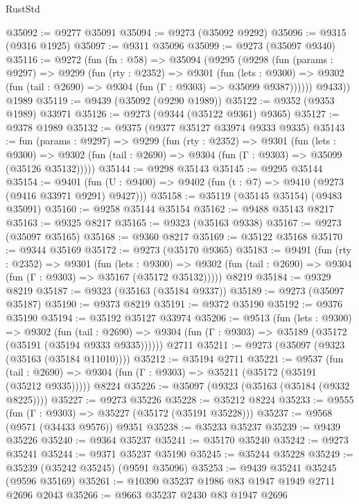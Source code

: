 \begin{lexlean}{RustStd}
\begin{coremodule}
@35092 := @9277 @35091
@35094 := @9273 (@35092 @9292)
@35096 := @9315 (@9316 @1925)
@35097 := @9311 @35096
@35099 := @9273 (@35097 @9340)
@35116 := @9272
    (fun (fn : @58) =>
    @35094
      (@9295
        (@9298
          (fun (params : @9297) =>
          @9299
            (fun (rty : @2352) =>
            @9301
              (fun (lets : @9300) =>
              @9302 (fun (tail : @2690) => @9304 (fun (Γ : @9303) => @35099 @9387))))))
        @9433))
    @1989
@35119 := @9439 (@35092 (@9290 @1989))
@35122 := @9352 (@9353 @1989) @33971
@35126 := @9273 (@9344 (@35122 @9361) @9365)
@35127 := @9378 @1989
@35132 := @9375 (@9377 @35127 @33974 @9333 @9335)
@35143 := fun (params : @9297) =>
  @9299
    (fun (rty : @2352) =>
    @9301
      (fun (lets : @9300) =>
      @9302 (fun (tail : @2690) => @9304 (fun (Γ : @9303) => @35099 (@35126 @35132)))))
@35144 := @9298 @35143
@35145 := @9295 @35144
@35154 := @9401
    (fun (U : @9400) => @9402 (fun (t : @7) => @9410 (@9273 (@9416 @33971 @9291) @9427)))
@35158 := @35119 (@35145 @35154) (@9483 @35091)
@35160 := @9258 @35144 @35154
@35162 := @9488 @35143 @8217
@35163 := @9325 @8217
@35165 := @9323 (@35163 @9338)
@35167 := @9273 (@35097 @35165)
@35168 := @9360 @8217
@35169 := @35122 @35168
@35170 := @9344 @35169
@35172 := @9273 (@35170 @9365)
@35183 := @9491
    (fun (rty : @2352) =>
    @9301
      (fun (lets : @9300) =>
      @9302 (fun (tail : @2690) => @9304 (fun (Γ : @9303) => @35167 (@35172 @35132)))))
    @8219
@35184 := @9329 @8219
@35187 := @9323 (@35163 (@35184 @9337))
@35189 := @9273 (@35097 @35187)
@35190 := @9373 @8219
@35191 := @9372 @35190
@35192 := @9376 @35190
@35194 := @35192 @35127 @33974
@35206 := @9513
    (fun (lets : @9300) =>
    @9302
      (fun (tail : @2690) =>
      @9304 (fun (Γ : @9303) => @35189 (@35172 (@35191 (@35194 @9333 @9335))))))
    @2711
@35211 := @9273 (@35097 (@9323 (@35163 (@35184 @11010))))
@35212 := @35194 @2711
@35221 := @9537
    (fun (tail : @2690) => @9304 (fun (Γ : @9303) => @35211 (@35172 (@35191 (@35212 @9335)))))
    @8224
@35226 := @35097 (@9323 (@35163 (@35184 (@9332 @8225))))
@35227 := @9273 @35226
@35228 := @35212 @8224
@35233 := @9555 (fun (Γ : @9303) => @35227 (@35172 (@35191 @35228)))
@35237 := @9568 (@9571 (@34433 @9576)) @9351
@35238 := @35233 @35237
@35239 := @9439 @35226
@35240 := @9364 @35237
@35241 := @35170 @35240
@35242 := @9273 @35241
@35244 := @9371 @35237 @35190
@35245 := @35244 @35228
@35249 := @35239 (@35242 @35245) (@9591 @35096)
@35253 := @9439 @35241 @35245 (@9596 @35169)
@35261 := @10390 @35237 @1986 @83 @1947 @1949 @2711 @2696 @2043
@35266 := @9663 @35237 @2430 @83 @1947 @2696

\end{coremodule}
\end{lexlean}
